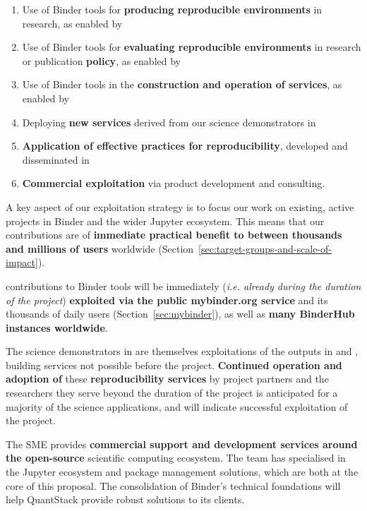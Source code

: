 \begin{enumerate}
  \item Use of Binder tools for \textbf{producing reproducible environments} in research, as enabled by 
  \item Use of Binder tools for \textbf{evaluating reproducible environments} in research or publication \textbf{policy}, as enabled by 
  \item Use of Binder tools in the \textbf{construction and operation of services}, as enabled by 
  \item Deploying \textbf{new services} derived from our science demonstrators in 
  \item \textbf{Application of effective practices for reproducibility}, developed and disseminated in 
  \item \textbf{Commercial exploitation} via product development and consulting.
\end{enumerate}

A key aspect of our exploitation strategy is to focus our work on existing,
active projects in Binder and the wider Jupyter ecosystem.
This means that our contributions are of \textbf{immediate practical benefit to between
  thousands and millions of users} worldwide (Section~\ref{sec:target-groups-and-scale-of-impact}).

\TheProject contributions to Binder tools will be immediately (\emph{i.e.
  already during the duration of the project}) \textbf{exploited via the public mybinder.org service}
and its thousands of daily users (Section~\ref{sec:mybinder}), as well as \textbf{many BinderHub instances worldwide}.

The science demonstrators in  are themselves exploitations of the outputs
in  and ,
building services not possible before the project.
\textbf{Continued operation and adoption of} these \textbf{reproducibility services} by project partners and the researchers they serve beyond
the duration of the project is anticipated for a majority of the science applications, and will indicate
successful exploitation of the project.


The  SME provides \textbf{commercial support and development services around the
open-source} scientific computing ecosystem. The team has specialised in the Jupyter ecosystem
and package management solutions, which are both at the core of this proposal. The consolidation
of Binder's technical foundations will help QuantStack provide robust solutions to its clients.

